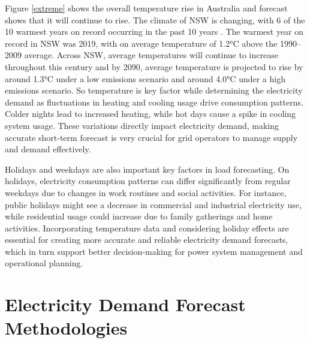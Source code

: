 \documentclass[mstat,12pt]{unswthesis}
\begin{document}
Figure \ref{extreme} shows the overall temperature rise in Australia and
forecast shows that it will continue to rise. The climate of NSW is
changing, with 6 of the 10 warmest years on record occurring in the past
10 years \cite{nswAdaptNSW}. The warmest year on record in NSW was 2019,
with on average temperature of 1.2°C above the 1990--2009 average.
Across NSW, average temperatures will continue to increase throughout
this century and by 2090, average temperature is projected to rise by
around 1.3°C under a low emissions scenario and around 4.0°C under a
high emissions scenario. So temperature is key factor while determining
the electricity demand as fluctuations in heating and cooling usage
drive consumption patterns. Colder nights lead to increased heating,
while hot days cause a spike in cooling system usage. These variations
directly impact electricity demand, making accurate short-term forecast
is very crucial for grid operators to manage supply and demand
effectively.

Holidays and weekdays are also important key factors in load
forecasting. On holidays, electricity consumption patterns can differ
significantly from regular weekdays due to changes in work routines and
social activities. For instance, public holidays might see a decrease in
commercial and industrial electricity use, while residential usage could
increase due to family gatherings and home activities. Incorporating
temperature data and considering holiday effects are essential for
creating more accurate and reliable electricity demand forecasts, which
in turn support better decision-making for power system management and
operational planning.

\bigskip

\section{Electricity Demand Forecast
Methodologies}\label{electricity-demand-forecast-methodologies}
\end{document}
